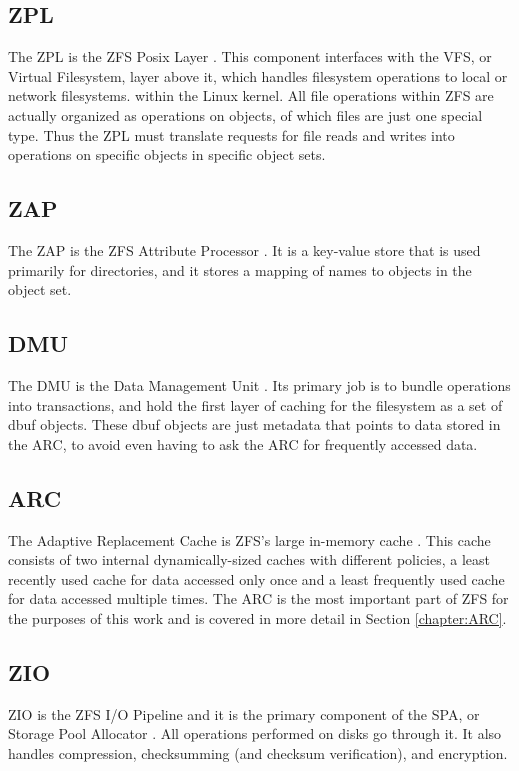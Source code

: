 \subsection{ZPL}
The ZPL is the ZFS Posix Layer \cite{dawidek_closer_2008}. 
This component interfaces with the VFS, or Virtual Filesystem, layer above it, which handles filesystem operations to local or network
filesystems.
within the Linux kernel.
All file operations within ZFS are actually organized as operations on objects, of which files are just one special type.
Thus the ZPL must translate requests for file reads and writes into operations on specific objects in specific object sets.

\subsection{ZAP}
The ZAP is the ZFS Attribute Processor \cite{dawidek_closer_2008}. 
It is a key-value store that is used primarily for directories, and it stores a mapping of names to objects in the object set.

\subsection{DMU}
The DMU is the Data Management Unit \cite{ahrens_read_write}. 
Its primary job is to bundle operations into transactions, and hold the first layer of caching for the filesystem as a set of dbuf objects. 
These dbuf objects are just metadata that points to data stored in the ARC, to avoid even having to ask the ARC for frequently accessed data.

\subsection{ARC}
The Adaptive Replacement Cache is ZFS's large in-memory cache \cite{ahrens_openzfs_basics, ahrens_read_write}.
This cache consists of two internal dynamically-sized caches with different policies, a least recently used cache
for data accessed only once and a least frequently used cache for data accessed multiple times.
The ARC is the most important part of ZFS for the purposes of this work and is covered in more detail in Section \ref{chapter:ARC}.

\subsection{ZIO}
ZIO is the ZFS I/O Pipeline and it is the primary component of the SPA, or Storage Pool Allocator \cite{ahrens_read_write}.
All operations performed on disks go through it. 
It also handles compression, checksumming (and checksum verification), and encryption.

